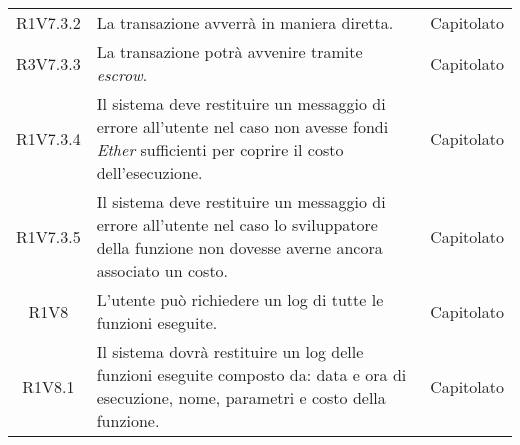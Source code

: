 \begin{longtable}{|c|p{8cm}|c|}
	R1V7.3.2 &  La transazione avverrà in maniera diretta. & Capitolato \\
	
	R3V7.3.3 &  La transazione potrà avvenire tramite \textit{escrow\glos}. & Capitolato \\
	
	R1V7.3.4 &  Il sistema deve restituire un messaggio di errore all'utente nel caso non avesse fondi  \textit{Ether\glos} sufficienti per coprire il costo dell'esecuzione. & Capitolato \\
	
	R1V7.3.5 &  Il sistema deve restituire un messaggio di errore all'utente nel caso lo sviluppatore della funzione non dovesse averne ancora associato un costo. & Capitolato \\
	
	R1V8 &  L'utente può richiedere un log di tutte le funzioni eseguite. & Capitolato \\	
	
	R1V8.1 &  Il sistema dovrà restituire un log delle funzioni eseguite composto da: data e ora di esecuzione, nome, parametri e costo della funzione. & Capitolato \\
	\hline
\end{longtable}